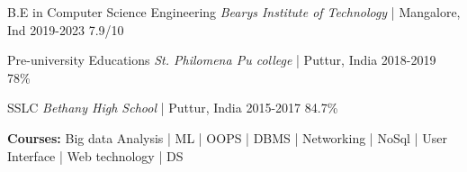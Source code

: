 



\begin{cvhonors}

  \cvhonor
    {\normalsize B.E in Computer Science Engineering} %
    {\textit{Bearys Institute of Technology} | Mangalore, Ind} %
    {2019-2023} %
    {7.9/10} %

    \cvhonor
    {\normalsize Pre-university Educations} %
    {\textit{St. Philomena Pu college} | Puttur, India} %
    {2018-2019} %
    {78\%} %

    \cvhonor
    {\normalsize SSLC} %
    {\textit{Bethany High School} | Puttur, India} %
    {2015-2017} %
    {84.7\%} %

\end{cvhonors}



\begin{cvparagraph}
{\normalsize\textbf{Courses:} Big data Analysis | ML | OOPS | DBMS | Networking | NoSql | User Interface | Web technology | DS\\}
\end{cvparagraph}


